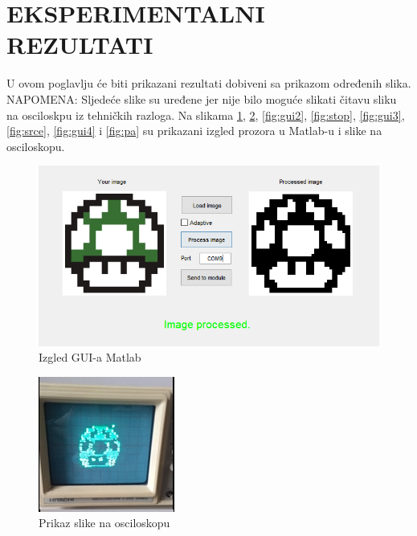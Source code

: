 \documentclass[12pt]{article}
\begin{document}
\pagebreak
\section{EKSPERIMENTALNI REZULTATI}
U ovom poglavlju će biti prikazani rezultati dobiveni sa prikazom određenih slika. NAPOMENA: Sljedeće slike su uređene jer nije bilo moguće slikati čitavu sliku na osciloskpu iz tehničkih razloga. \newline
Na slikama \ref{fig:gui}, \ref{fig:gljivica}, \ref{fig:gui2}, \ref{fig:stop}, \ref{fig:gui3}, \ref{fig:srce}, \ref{fig:gui4} i \ref{fig:pa} su prikazani izgled prozora u Matlab-u i slike na osciloskopu.
\begin{figure}[h!]
    \centering
  \includegraphics[scale=0.4]{izgledGUIa.png}
  \caption{Izgled GUI-a Matlab}
  \label{fig:gui}
\end{figure}
\begin{figure}[h!]
    \centering
  \includegraphics[scale=1.55]{gljivica3.jpg}
  \caption{Prikaz slike na osciloskopu}
  \label{fig:gljivica}
\end{figure}
\end{document}
